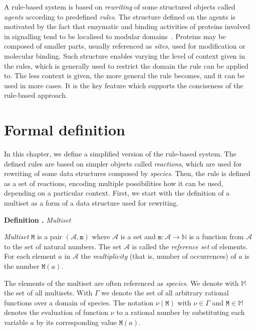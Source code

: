 \documentclass[11pt,a4paper]{report}
\newcounter{counter}[section]
\renewcommand{\thecounter}{\thechapter.\arabic{counter}}
\newenvironment{definition}[1]{\bigskip\refstepcounter{counter}\noindent\textbf{Definition \thecounter } \emph{#1} \par\nopagebreak\noindent \begin{itshape}}{\end{itshape}\bigskip}
\begin{document}
A rule-based system is based on \emph{rewriting} of some structured objects called \emph{agents} according to predefined \emph{rules}. The structure defined on the agents is motivated by the fact that enzymatic and binding activities of proteins involved in signalling tend to be localised to modular domains~\cite{pawson2003assembly}. Proteins may be composed of smaller parts, usually referenced as \emph{sites}, used for modification or molecular binding. Such structure enables varying the level of context given in the rules, which is generally used to restrict the domain the rule can be applied to. The less context is given, the more general the rule becomes, and it can be used in more cases. It is the key feature which supports the conciseness of the rule-based approach.

\section{Formal definition}

In this chapter, we define a simplified version of the rule-based system. The defined rules are based on simpler objects called \emph{reactions}, which are used for rewriting of some data structures composed by \emph{species}. Then, the rule is defined as a set of reactions, encoding multiple possibilities how it can be used, depending on a particular context. First, we start with the definition of a multiset as a form of a data structure used for rewriting.

\begin{definition}{Multiset}
\emph{Multiset} $\mathtt{M}$ is a pair $(\mathcal{A}, \mathtt{m})$ where $\mathcal{A}$ is a set and $ \mathtt{m} : \mathcal{A} \rightarrow \mathbb{N} $ is a function from $\mathcal{A}$ to the set of natural numbers. The set $\mathcal{A}$ is called the \emph{reference set} of elements. For each element $\mathit{a}$ in $\mathcal{A}$ the \emph{multiplicity} (that is, number of occurrences) of $\mathit{a}$ is the number $\mathtt{M}(\mathit{a})$.
\end{definition}

The elements of the multiset are often referenced as \emph{species}. We denote with $\mathbb{M}$ the set of all multisets. With $\Gamma$ we denote the set of all arbitrary rational functions over a domain of species. The notation $\nu(\mathtt{M})$ with $\nu \in \Gamma$ and $\mathtt{M} \in \mathbb{M}$ denotes the evaluation of function $\nu$ to a rational number by substituting each variable $\mathit{a}$ by its corresponding value $\mathtt{M}(\mathit{a})$.
\end{document}
